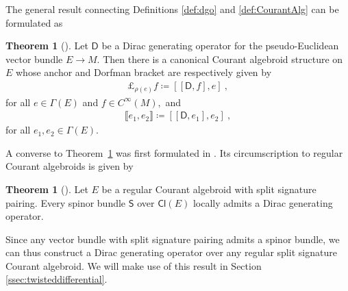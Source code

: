 \documentclass[a4paper, reqno, 11pt]{amsart}
\numberwithin{equation}{section}
\theoremstyle{definition}
\newtheorem{theorem}[equation]{Theorem}
\newcommand{\cbrak}[1]{\llbracket #1 \rrbracket}
\newcommand{\Cl}{\mathsf{Cl}}
\newcommand{\sfD}{{\mathsf{D}}}
\newcommand{\sfS}{{\mathsf{S}}}
\newcommand{\sfGamma}{{\mathsf{\Gamma}}}
\theoremstyle{remark}
\begin{document}
The general result connecting Definitions \ref{def:dgo} and \ref{def:CourantAlg} can  be formulated as

\begin{theorem}[\!\!\!\textbf{\cite[Corollary 2.3]{Alekseev2001}}] \label{thm:CourantDirac}
    Let $\sfD$ be a Dirac generating operator for the pseudo-Euclidean vector bundle $E \to M.$ Then there is a canonical Courant algebroid structure on $E$ whose anchor and Dorfman bracket are respectively given by
    \begin{align}
        \pounds_{\rho(e)} f \coloneqq [[\sfD, f], e] \ ,
    \end{align}
    for all $e \in \sfGamma(E)$ and $f \in C^\infty(M),$ and
    \begin{align}
        \cbrak{e_1, e_2} \coloneqq [[\sfD, e_1], e_2] \ ,
    \end{align}
    for all $e_1, e_2 \in \sfGamma(E).$
\end{theorem}

A converse to Theorem~\ref{thm:CourantDirac} was first formulated in \cite{Alekseev2001}. Its circumscription to {regular} Courant algebroids is given by

\begin{theorem}[\!\!\!\textbf{\cite[Theorem 41]{Cortes:2019roa}}] \label{thm:DGOconverse}
    Let $E$ be a regular Courant algebroid with split signature pairing. Every spinor bundle $\sfS$ over $\Cl(E)$  locally admits a Dirac generating operator.
\end{theorem}

Since any vector bundle with split signature pairing admits a spinor bundle, we can thus construct a Dirac generating operator over any regular split signature Courant algebroid. We will make use of this result in Section \ref{ssec:twisteddifferential}.
\end{document}
